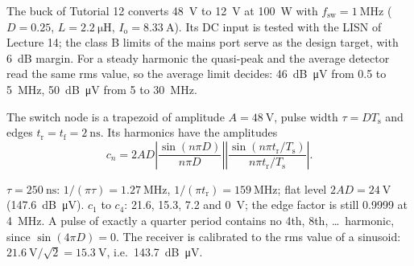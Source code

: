 
The buck of Tutorial 12 converts \SI{48}{\volt} to \SI{12}{\volt} at \SI{100}{\watt} with $f_\mathrm{sw}=\SI{1}{\mega\hertz}$ ($D=0.25$, $L=\SI{2.2}{\micro\henry}$, $I_\mathrm{o}=\SI{8.33}{\ampere}$). Its DC input is tested with the LISN of Lecture 14; the class B limits of the mains port serve as the design target, with \SI{6}{dB} margin. For a steady harmonic the quasi-peak and the average detector read the same rms value, so the average limit decides: \SI{46}{dB\micro\volt} from 0.5 to \SI{5}{\mega\hertz}, \SI{50}{dB\micro\volt} from 5 to \SI{30}{\mega\hertz}.



The switch node is a trapezoid of amplitude $A=\SI{48}{\volt}$, pulse width $\tau=DT_\mathrm{s}$ and edges $t_\mathrm{r}=t_\mathrm{f}=\SI{2}{\nano\second}$. Its harmonics have the amplitudes
\begin{equation}
	c_n=2AD\left|\frac{\sin(n\pi D)}{n\pi D}\right|\left|\frac{\sin(n\pi t_\mathrm{r}/T_\mathrm{s})}{n\pi t_\mathrm{r}/T_\mathrm{s}}\right|.
\end{equation}


\begin{solutionblock}
	$\tau=\SI{250}{\nano\second}$: $1/(\pi\tau)=\SI{1.27}{\mega\hertz}$, $1/(\pi t_\mathrm{r})=\SI{159}{\mega\hertz}$; flat level $2AD=\SI{24}{\volt}$ (\SI{147.6}{dB\micro\volt}). $c_1$ to $c_4$: 21.6, 15.3, 7.2 and \SI{0}{\volt}; the edge factor is still 0.9999 at \SI{4}{\mega\hertz}. A pulse of exactly a quarter period contains no 4th, 8th, \ldots\ harmonic, since $\sin(4\pi D)=0$. The receiver is calibrated to the rms value of a sinusoid: $\SI{21.6}{\volt}/\sqrt{2}=\SI{15.3}{\volt}$, i.e.\ \SI{143.7}{dB\micro\volt}.
\end{solutionblock}



